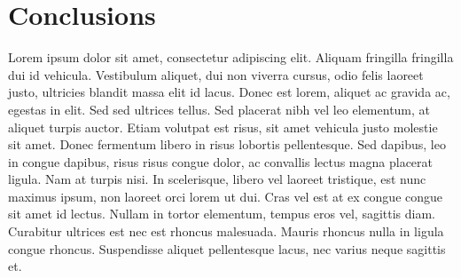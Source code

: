 \section{Conclusions}
Lorem ipsum dolor sit amet, consectetur adipiscing elit. Aliquam fringilla fringilla dui id vehicula. Vestibulum aliquet, dui non viverra cursus, odio felis laoreet justo, ultricies blandit massa elit id lacus. Donec est lorem, aliquet ac gravida ac, egestas in elit. Sed sed ultrices tellus. Sed placerat nibh vel leo elementum, at aliquet turpis auctor. Etiam volutpat est risus, sit amet vehicula justo molestie sit amet. Donec fermentum libero in risus lobortis pellentesque. Sed dapibus, leo in congue dapibus, risus risus congue dolor, ac convallis lectus magna placerat ligula. Nam at turpis nisi. In scelerisque, libero vel laoreet tristique, est nunc maximus ipsum, non laoreet orci lorem ut dui. Cras vel est at ex congue congue sit amet id lectus. Nullam in tortor elementum, tempus eros vel, sagittis diam. Curabitur ultrices est nec est rhoncus malesuada. Mauris rhoncus nulla in ligula congue rhoncus. Suspendisse aliquet pellentesque lacus, nec varius neque sagittis et.
\cite{lamport94}